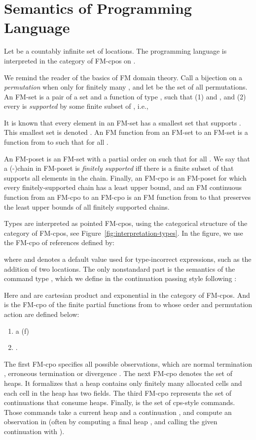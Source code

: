 \documentclass{LMCS}
\newcommand{\dom}{\mathsf{dom}}
\begin{document}
\section{Semantics of Programming Language}
\label{sec:semantics-pl}
Let  be a countably infinite set of locations.
The programming language is interpreted in the category 
of FM-cpos on .

We remind the reader of the basics of FM domain theory.
Call a bijection  on  a {\em permutation\/}
when  only for finitely many ,
and let  be the set of all permutations.
An FM-set is a pair of a set  and a function
 of type , such
that (1)  and 
, and (2)
every  is {\em supported\/} 
by some finite subset  of , i.e.,

It is known that every element  in an FM-set  has
a smallest set  that supports . This smallest set
is denoted . An FM function  from an FM-set  to an FM-set  is
a function from  to  such that 
 for all .

An FM-poset is an FM-set  with a partial order  on 
 such that 
for all . We say that a (-)chain  in FM-poset
 is {\em finitely supported\/} 
iff there is a finite subset  of 
that supports all elements in the chain. Finally, an 
FM-cpo is an FM-poset  for which
 every finitely-supported 
chain  has a least upper bound, and an FM continuous
function  from an FM-cpo  to an FM-cpo  is
an FM function from  to  that preserves the least upper bounds
of all finitely supported chains.

Types are interpreted as pointed FM-cpos,
using the categorical structure of the category of FM-cpos,
see Figure~\ref{fig:interpretation-types}. In the figure,
we use the FM-cpo   of references defined by:

where  and  denotes a default value used for
type-incorrect expressions, such as the addition of two
locations.
The only nonstandard part
is the semantics of the command type
, which we define in the continuation passing
style following \cite{PittsAM:monsf,benton}:

Here  and  are cartesian product and exponential
in the category of FM-cpos. And  is the FM-cpo
of the finite partial functions from  to  whose order
and permutation action are defined below:
\begin{enumerate}
\item a \in \dom(f) 
\item .
\end{enumerate}


The first FM-cpo  specifies all 
possible observations, which are
normal termination , erroneous termination 
or divergence . The next FM-cpo  
denotes the set of heaps.  It formalizes that a heap
contains only finitely many allocated cells and each
cell in the heap has two fields. The third FM-cpo 
represents the set of continuations that consume heaps. Finally,
 is the set of cps-style commands. Those commands
take a current heap  and a continuation ,
and compute an observation in  (often by 
computing a final heap , and
calling the given continuation  with ).
\end{document}
